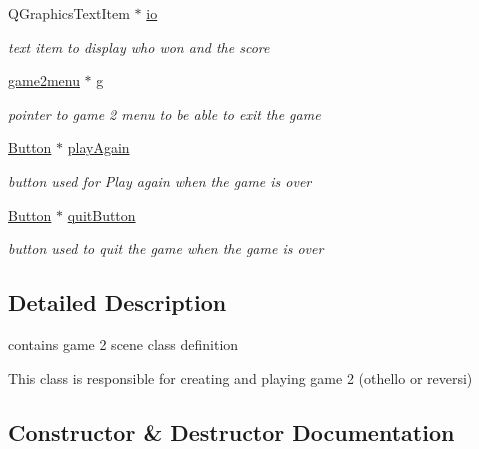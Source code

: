 \begin{DoxyCompactItemize}
\mbox{\label{classgame2scene_a99c8aa963d23ccffbcc4f3fca4b2fb2e}} 
Q\+Graphics\+Text\+Item $\ast$ \hyperlink{classgame2scene_a99c8aa963d23ccffbcc4f3fca4b2fb2e}{io}
\begin{DoxyCompactList}\small\item\em text item to display who won and the score \end{DoxyCompactList}\item 
\mbox{\label{classgame2scene_a791537ed5b1fb8d2a007dee9ba6916d4}} 
\hyperlink{classgame2menu}{game2menu} $\ast$ \hyperlink{classgame2scene_a791537ed5b1fb8d2a007dee9ba6916d4}{g}
\begin{DoxyCompactList}\small\item\em pointer to game 2 menu to be able to exit the game \end{DoxyCompactList}\item 
\mbox{\label{classgame2scene_ad42a753ce56a92b1963258a64b6a29d3}} 
\hyperlink{classButton}{Button} $\ast$ \hyperlink{classgame2scene_ad42a753ce56a92b1963258a64b6a29d3}{play\+Again}
\begin{DoxyCompactList}\small\item\em button used for Play again when the game is over \end{DoxyCompactList}\item 
\mbox{\label{classgame2scene_a87b11f6fc01d8073e9421d4b39aa2ddb}} 
\hyperlink{classButton}{Button} $\ast$ \hyperlink{classgame2scene_a87b11f6fc01d8073e9421d4b39aa2ddb}{quit\+Button}
\begin{DoxyCompactList}\small\item\em button used to quit the game when the game is over \end{DoxyCompactList}\end{DoxyCompactItemize}


\subsection{Detailed Description}
contains game 2 scene class definition 

This class is responsible for creating and playing game 2 (othello or reversi) 

\subsection{Constructor \& Destructor Documentation}
\mbox{\label{classgame2scene_aa3642161921dd08a8fa5c83e94c2ffe0}} 
